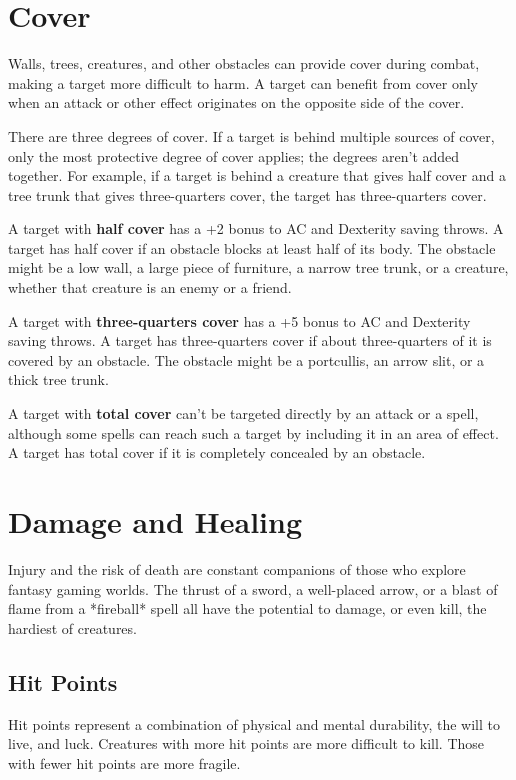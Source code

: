 \section{Cover}

Walls, trees, creatures, and other obstacles can provide cover during combat, making a target more difficult to harm. A target can benefit from cover only when an attack or other effect originates on the opposite side of the cover.

There are three degrees of cover. If a target is behind multiple sources of cover, only the most protective degree of cover applies; the degrees aren't added together. For example, if a target is behind a creature that gives half cover and a tree trunk that gives three-quarters cover, the target has three-quarters cover.

A target with \textbf{half cover} has a +2 bonus to AC and Dexterity saving throws. A target has half cover if an obstacle blocks at least half of its body. The obstacle might be a low wall, a large piece of furniture, a narrow tree trunk, or a creature, whether that creature is an enemy or a friend.

A target with \textbf{three-quarters cover} has a +5 bonus to AC and Dexterity saving throws. A target has three-quarters cover if about three-quarters of it is covered by an obstacle. The obstacle might be a portcullis, an arrow slit, or a thick tree trunk.

A target with \textbf{total cover} can't be targeted directly by an attack or a spell, although some spells can reach such a target by including it in an area of effect. A target has total cover if it is completely concealed by an obstacle.

\section{Damage and Healing}

Injury and the risk of death are constant companions of those who explore fantasy gaming worlds. The thrust of a sword, a well-placed arrow, or a blast of flame from a *fireball* spell all have the potential to damage, or even kill, the hardiest of creatures.

\subsection{Hit Points}

Hit points represent a combination of physical and mental durability, the will to live, and luck. Creatures with more hit points are more difficult to kill. Those with fewer hit points are more fragile.


